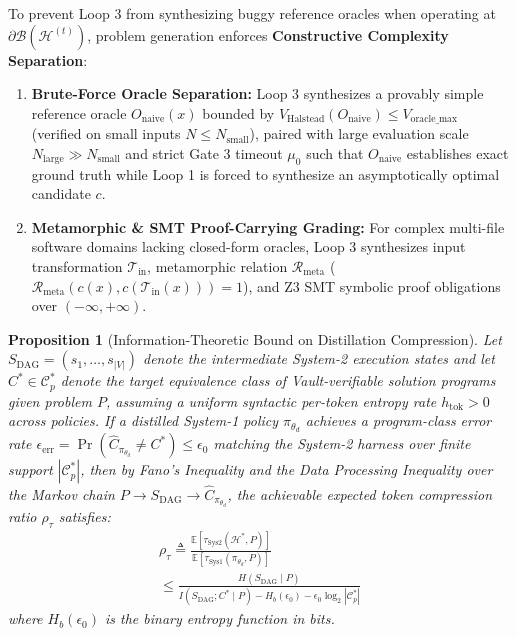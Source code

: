 \documentclass[10pt,twocolumn,letterpaper]{article}
\newtheorem{proposition}{Proposition}
\begin{document}
To prevent Loop 3 from synthesizing buggy reference oracles when operating at $\partial\mathcal{B}(\mathcal{H}^{(t)})$, problem generation enforces \textbf{Constructive Complexity Separation}:
\begin{enumerate}
    \item \textbf{Brute-Force Oracle Separation:} Loop 3 synthesizes a provably simple reference oracle $O_{\text{naive}}(x)$ bounded by $V_{\text{Halstead}}(O_{\text{naive}})\le V_{\text{oracle\_max}}$ (verified on small inputs $N\le N_{\text{small}}$), paired with large evaluation scale $N_{\text{large}}\gg N_{\text{small}}$ and strict Gate 3 timeout $\mu_{0}$ such that $O_{\text{naive}}$ establishes exact ground truth while Loop 1 is forced to synthesize an asymptotically optimal candidate $c$.
    \item \textbf{Metamorphic \& SMT Proof-Carrying Grading:} For complex multi-file software domains lacking closed-form oracles, Loop 3 synthesizes input transformation $\mathcal{T}_{\text{in}}$, metamorphic relation $\mathcal{R}_{\text{meta}}$ ($\mathcal{R}_{\text{meta}}(c(x),c(\mathcal{T}_{\text{in}}(x)))=1$), and Z3 SMT symbolic proof obligations over $(-\infty,+\infty)$.
\end{enumerate}

\begin{proposition}[Information-Theoretic Bound on Distillation Compression]
Let $S_{\text{DAG}}=(s_{1},\dots,s_{|V|})$ denote the intermediate System-2 execution states and let $C^{*}\in\mathcal{C}_{p}^{*}$ denote the target equivalence class of Vault-verifiable solution programs given problem $P$, assuming a uniform syntactic per-token entropy rate $h_{\text{tok}}>0$ across policies. If a distilled System-1 policy $\pi_{\theta_{d}}$ achieves a program-class error rate $\epsilon_{\text{err}}=\Pr(\hat{C}_{\pi_{\theta_{d}}}\neq C^{*})\le\epsilon_{0}$ matching the System-2 harness over finite support $|\mathcal{C}_{p}^{*}|$, then by Fano's Inequality and the Data Processing Inequality over the Markov chain $P\to S_{\text{DAG}}\to\hat{C}_{\pi_{\theta_{d}}}$, the achievable expected token compression ratio $\rho_{\tau}$ satisfies:
\begin{multline}
\rho_{\tau}\triangleq\frac{\mathbb{E}\!\left[\tau_{\text{Sys2}}(\mathcal{H}^{*},P)\right]}{\mathbb{E}\!\left[\tau_{\text{Sys1}}(\pi_{\theta_{d}},P)\right]} \\
\le \frac{H(S_{\text{DAG}}\mid P)}{I(S_{\text{DAG}};C^{*}\mid P)-H_{b}(\epsilon_{0})-\epsilon_{0}\log_{2}|\mathcal{C}_{p}^{*}|}
\end{multline}
where $H_{b}(\epsilon_{0})$ is the binary entropy function in bits.
\end{proposition}
\end{document}
